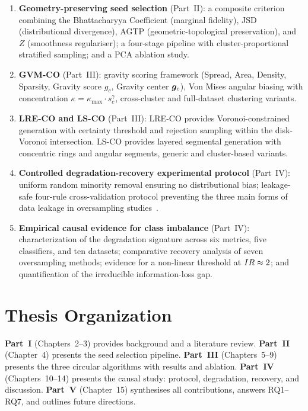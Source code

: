 \begin{enumerate}[label=\textbf{C\arabic*.}, leftmargin=*, itemsep=4pt]
  \item \textbf{Geometry-preserving seed selection} (Part~II): a composite criterion combining the Bhattacharyya Coefficient (marginal fidelity), JSD (distributional divergence), AGTP (geometric-topological preservation), and $Z$ (smoothness regulariser); a four-stage pipeline with cluster-proportional stratified sampling; and a PCA ablation study.

  \item \textbf{GVM-CO} (Part~III): gravity scoring framework (Spread, Area, Density, Sparsity, Gravity score $g_c$, Gravity center $\bm{g}_c$), Von Mises angular biasing with concentration $\kappa = \kappa_{\max} \cdot s_c^{\gamma}$, cross-cluster and full-dataset clustering variants.

  \item \textbf{LRE-CO and LS-CO} (Part~III): LRE-CO provides Voronoi-constrained generation with certainty threshold and rejection sampling within the disk-Voronoi intersection. LS-CO provides layered segmental generation with concentric rings and angular segments, generic and cluster-based variants.

  \item \textbf{Controlled degradation-recovery experimental protocol} (Part~IV): uniform random minority removal ensuring no distributional bias; leakage-safe four-rule cross-validation protocol preventing the three main forms of data leakage in oversampling studies~\cite{kaufman2012leakage, cawley2010over}.

  \item \textbf{Empirical causal evidence for class imbalance} (Part~IV): characterization of the degradation signature across six metrics, five classifiers, and ten datasets; comparative recovery analysis of seven oversampling methods; evidence for a non-linear threshold at $IR \approx 2$; and quantification of the irreducible information-loss gap.
\end{enumerate}

\section{Thesis Organization}
\label{sec:intro:organization}

\textbf{Part~I} (Chapters~2--3) provides background and a literature review.
\textbf{Part~II} (Chapter~4) presents the seed selection pipeline.
\textbf{Part~III} (Chapters~5--9) presents the three circular algorithms with results and ablation.
\textbf{Part~IV} (Chapters~10--14) presents the causal study: protocol, degradation, recovery, and discussion.
\textbf{Part~V} (Chapter~15) synthesises all contributions, answers RQ1--RQ7, and outlines future directions.
